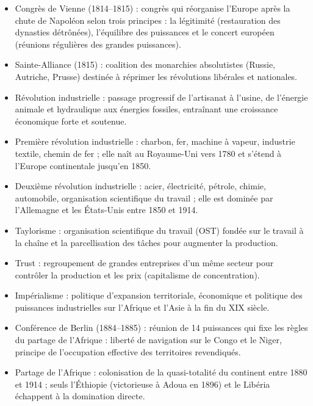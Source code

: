 \documentclass[11pt]{article}
\newcommand{\cle}[1]{{\popxbold\color{popdark}#1}}
\begin{document}
\begin{aretenir}
\begin{itemize}
    \item \cle{Congrès de Vienne (1814--1815)} : congrès qui réorganise l'Europe après la chute de Napoléon selon trois principes : la \cle{légitimité} (restauration des dynasties détrônées), l'\cle{équilibre} des puissances et le concert européen (réunions régulières des grandes puissances).
    \item \cle{Sainte-Alliance (1815)} : coalition des monarchies absolutistes (Russie, Autriche, Prusse) destinée à réprimer les révolutions libérales et nationales.
    \item \cle{Révolution industrielle} : passage progressif de l'artisanat à l'usine, de l'énergie animale et hydraulique aux énergies fossiles, entraînant une croissance économique forte et soutenue.
    \item \cle{Première révolution industrielle} : charbon, fer, machine à vapeur, industrie textile, chemin de fer ; elle naît au Royaume-Uni vers 1780 et s'étend à l'Europe continentale jusqu'en 1850.
    \item \cle{Deuxième révolution industrielle} : acier, électricité, pétrole, chimie, automobile, organisation scientifique du travail ; elle est dominée par l'Allemagne et les États-Unis entre 1850 et 1914.
    \item \cle{Taylorisme} : organisation scientifique du travail (OST) fondée sur le travail à la chaîne et la parcellisation des tâches pour augmenter la production.
    \item \cle{Trust} : regroupement de grandes entreprises d'un même secteur pour contrôler la production et les prix (capitalisme de concentration).
    \item \cle{Impérialisme} : politique d'expansion territoriale, économique et politique des puissances industrielles sur l'Afrique et l'Asie à la fin du XIX\ieme{} siècle.
    \item \cle{Conférence de Berlin (1884--1885)} : réunion de 14 puissances qui fixe les règles du partage de l'Afrique : liberté de navigation sur le Congo et le Niger, principe de l'\cle{occupation effective} des territoires revendiqués.
    \item \cle{Partage de l'Afrique} : colonisation de la quasi-totalité du continent entre 1880 et 1914 ; seuls l'Éthiopie (victorieuse à Adoua en 1896) et le Libéria échappent à la domination directe.
\end{itemize}
\end{aretenir}
\end{document}

